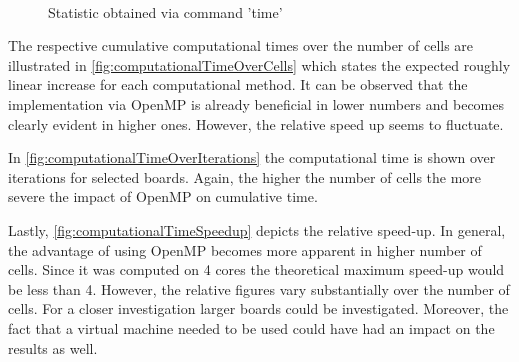 \begin{figure}\centering
	 \\
	\caption{Statistic obtained via command 'time'}
	\label{fig:CommandLineResults}
\end{figure}

\smallskip

The respective cumulative computational times over the number of cells are illustrated in \cref{fig:computationalTimeOverCells} which states the expected roughly linear increase for each computational method. It can be observed that the implementation via OpenMP is already beneficial in lower numbers and becomes clearly evident in higher ones. However, the relative speed up seems to fluctuate.

\smallskip

In \cref{fig:computationalTimeOverIterations} the computational time is shown over iterations for selected boards. Again, the higher the number of cells the more severe the impact of OpenMP on cumulative time.

\smallskip

Lastly, \cref{fig:computationalTimeSpeedup} depicts the relative speed-up. In general, the advantage of using OpenMP becomes more apparent in higher number of cells. Since it was computed on 4 cores the theoretical maximum speed-up would be less than 4. However, the relative figures vary substantially over the number of cells. For a closer investigation larger boards could be investigated. Moreover, the fact that a virtual machine needed to be used could have had an impact on the results as well.

